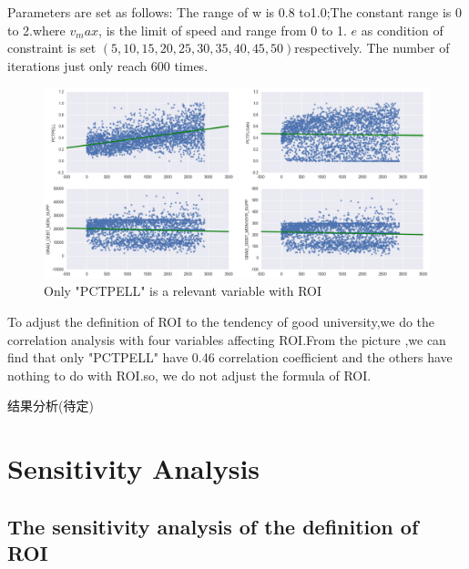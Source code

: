 \documentclass{mcmthesis}
\begin{document}
Parameters are set as follows:
The range of w is 0.8 to1.0;The constant range is 0 to 2.where $v_max$, is the limit of speed and range from 0 to 1.
$e$ as condition of constraint is set $(5,10,15,20,25,30,35,40,45,50)$respectively. 
The number of iterations just only reach 600 times.


\begin{figure}[h]
    \centering
    \includegraphics[width=\linewidth]{"figure/relevant-variable-with-ROI"}
    \caption{Only "PCTPELL" is a relevant variable with ROI}
\end{figure}

To adjust the definition of ROI to the tendency of good university,we do the correlation analysis with four variables affecting ROI.From the picture ,we can find that only "PCTPELL" have 0.46 correlation coefficient  and the others have nothing to do with ROI.so, we do not adjust the formula of ROI.\par

结果分析(待定)

\section{Sensitivity Analysis}
\subsection{The sensitivity analysis of the definition of ROI}
\end{document}
